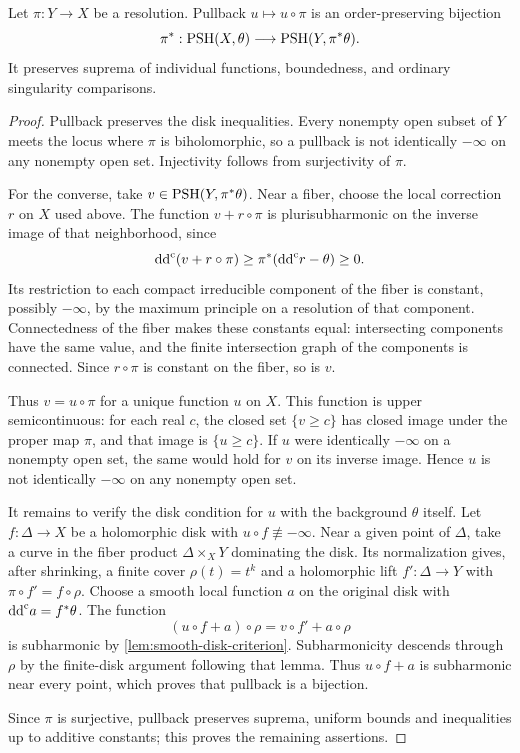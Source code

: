 \begin{theorem}\label{thm:hermitian-space-descent}
Let $\pi\colon Y\to X$ be a resolution. Pullback $u\mapsto u\circ\pi$ is an order-preserving bijection
\[
 \pi^*:\mathrm{PSH}(X,\theta)\longrightarrow\mathrm{PSH}(Y,\pi^*\theta).
\]
It preserves suprema of individual functions, boundedness, and ordinary singularity comparisons.
\end{theorem}
\begin{proof}
Pullback preserves the disk inequalities. Every nonempty open subset of $Y$ meets the locus where $\pi$ is biholomorphic, so a pullback is not identically $-\infty$ on any nonempty open set. Injectivity follows from surjectivity of $\pi$.

For the converse, take $v\in\mathrm{PSH}(Y,\pi^*\theta)$. Near a fiber, choose the local correction $r$ on $X$ used above. The function $v+r\circ\pi$ is plurisubharmonic on the inverse image of that neighborhood, since
\[
 \mathrm{dd}^{\mathrm{c}}(v+r\circ\pi)\geq\pi^*(\mathrm{dd}^{\mathrm{c}} r-\theta)\geq0.
\]
Its restriction to each compact irreducible component of the fiber is constant, possibly $-\infty$, by the maximum principle on a resolution of that component. Connectedness of the fiber makes these constants equal: intersecting components have the same value, and the finite intersection graph of the components is connected. Since $r\circ\pi$ is constant on the fiber, so is $v$.

Thus $v=u\circ\pi$ for a unique function $u$ on $X$. This function is upper semicontinuous: for each real $c$, the closed set $\{v\geq c\}$ has closed image under the proper map $\pi$, and that image is $\{u\geq c\}$. If $u$ were identically $-\infty$ on a nonempty open set, the same would hold for $v$ on its inverse image. Hence $u$ is not identically $-\infty$ on any nonempty open set.

It remains to verify the disk condition for $u$ with the background $\theta$ itself. Let $f\colon \Delta\to X$ be a holomorphic disk with $u\circ f\not\equiv-\infty$. Near a given point of $\Delta$, take a curve in the fiber product $\Delta\times_XY$ dominating the disk. Its normalization gives, after shrinking, a finite cover $\rho(t)=t^k$ and a holomorphic lift $f':\Delta\to Y$ with $\pi\circ f'=f\circ\rho$. Choose a smooth local function $a$ on the original disk with $\mathrm{dd}^{\mathrm{c}} a=f^*\theta$. The function
\[
 (u\circ f+a)\circ\rho=v\circ f'+a\circ\rho
\]
is subharmonic by \cref{lem:smooth-disk-criterion}. Subharmonicity descends through $\rho$ by the finite-disk argument following that lemma. Thus $u\circ f+a$ is subharmonic near every point, which proves that pullback is a bijection.

Since $\pi$ is surjective, pullback preserves suprema, uniform bounds and inequalities up to additive constants; this proves the remaining assertions.
\end{proof}

